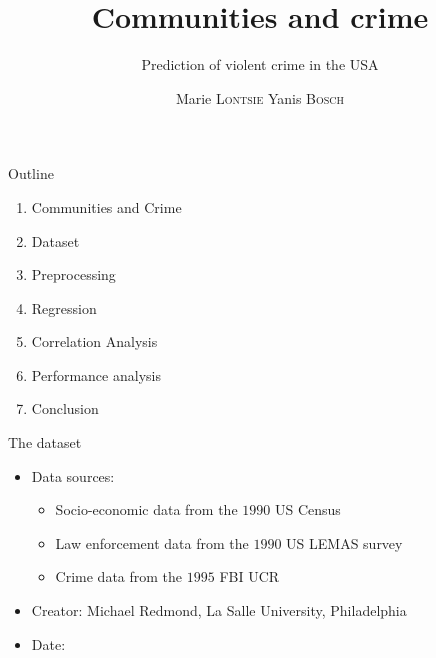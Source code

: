 \documentclass{beamer}
\begin{document}
	\begin{frame}
		\title{Communities and crime}
		\subtitle{Prediction of violent crime in the USA}
		\author{Marie \textsc{Lontsie} Yanis \textsc{Bosch}}
		\maketitle
	\end{frame}

	\begin{frame}{Outline}
		\begin{enumerate}
                        \item Communities and Crime
			\item Dataset
			\item Preprocessing
			\item Regression
			\item Correlation Analysis
			\item Performance analysis
			\item Conclusion
		\end{enumerate}
	\end{frame}

	\begin{frame}{The dataset}
		\begin{itemize}
			\item Data sources:
				\begin{itemize}
					\item Socio-economic data from the $1990$ US Census
					\item Law enforcement data from the $1990$ US LEMAS survey
					\item Crime data from the $1995$ FBI UCR
				\end{itemize}
			\item Creator: Michael Redmond, La Salle University, Philadelphia
			\item Date: \formatdate{13}{7}{2009}
		\end{itemize}
	\end{frame}
\end{document}
